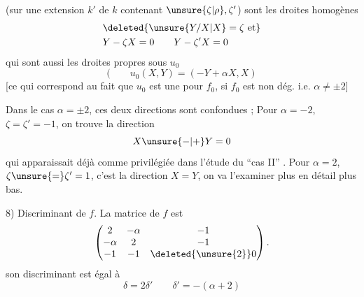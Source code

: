 (sur une extension $k'$ de $k$ contenant $\unsure{\zeta|\rho},\zeta'$) sont les droites homogènes
\[
\begin{aligned}
&\deleted{\unsure{Y/X|X}=\zeta\ \text{et}}\\
&Y-\zeta X=0\qquad Y-\zeta'X=0
\end{aligned}
\]
qui sont aussi les droites propres sous $u_0$
\[
(\qquad u_0(X,Y)=(-Y+\alpha X,X)
\]
[ce qui correspond au fait que $u_0$ est une  \uline{} pour $f_0$, si $f_0$ est non dég. i.e. $\alpha\ne\pm2$]

Dans le cas $\alpha=\pm2$, ces deux directions sont confondues ;  Pour $\alpha=-2$, $\zeta=\zeta'=-1$, on trouve la direction
\[
X\unsure{-|+}Y=0
\]
qui apparaissait déjà comme privilégiée dans l'étude du ``cas II'' . Pour $\alpha=2$, $\zeta\unsure{=}\zeta'=1$, c'est la direction $X=Y$,  on va l'examiner plus en détail plus bas.

8) Discriminant  de $f$. La matrice de $f$ est
\[
\begin{pmatrix}2&-\alpha&-1\\-\alpha&2&-1\\-1&-1&\deleted{\unsure{2}}0\end{pmatrix}.
\]
son discriminant est égal à
\[
\delta=2\delta'\qquad\delta'=-(\alpha+2)
\]
